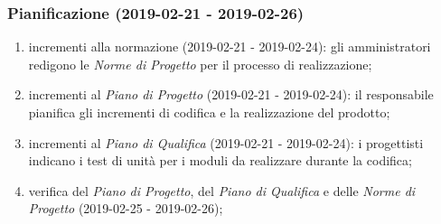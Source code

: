 		\subsubsection{Pianificazione (2019-02-21 - 2019-02-26)}
			\begin{enumerate}[label= 4.1.\arabic*)]
				\item incrementi alla normazione (2019-02-21 - 2019-02-24): gli amministratori redigono le \textit{Norme di Progetto} per il processo di realizzazione;
				\item incrementi al \textit{Piano di Progetto} (2019-02-21 - 2019-02-24): il responsabile pianifica gli incrementi di codifica e la realizzazione del prodotto;
				\item incrementi al \textit{Piano di Qualifica} (2019-02-21 - 2019-02-24): i progettisti indicano i test di unità per i moduli da realizzare durante la codifica;
				\item verifica del \textit{Piano di Progetto}, del \textit{Piano di Qualifica} e delle \textit{Norme di Progetto} (2019-02-25 - 2019-02-26);
			\end{enumerate}
